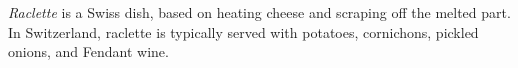 \emph{Raclette} is a Swiss dish, based on heating cheese and scraping off the melted part.
In Switzerland, raclette is typically served with potatoes, cornichons, pickled onions, and Fendant wine.
